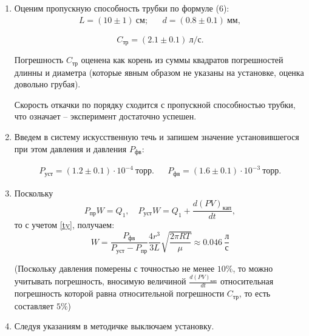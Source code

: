 \documentclass[a4paper,12pt]{article}
\begin{document}
\begin{enumerate}
  \item Оценим пропускную способность трубки по формуле (6):
        \begin{align}
          L = (10 \pm 1)~ см; &  & d = (0.8 \pm 0.1) ~ мм,
        \end{align}

        \begin{equation}
          C_{тр} = (2.1 \pm 0.1)~л / с.
        \end{equation}

        Погрешность $C_{тр}$  оценена как корень из суммы квадратов погрешностей длинны и диаметра (которые явным образом не указаны на установке, оценка довольно грубая).

        Скорость откачки по порядку сходится с пропускной способностью трубки, что означает -- эксперимент достаточно успешен.

  \item Введем в систему искусственную течь и запишем значение  установившегося при этом давления и давления $P_{фв}$:

        \begin{align}
          P_{уст} = (1.2 \pm 0.1) \cdot 10^{-4} ~ торр. &  & P_{фв} = (1.6 \pm 0.1) \cdot 10^{-3} ~ торр.
        \end{align}


  \item Поскольку
        $$P_{пр} W = Q_1, \quad P_{уст} W = Q_1 + \frac{d(PV)_{кап}}{dt},$$
        то с учетом \eqref{ty}, получаем:
        \begin{equation}
          W = \frac{P_{фв}}{P_{уст}-P_{пр}}\frac{4r^3}{3L}\sqrt{\frac{2\pi RT}{\mu}} \approx 0.046~\frac{л}{с}
        \end{equation}

        (Поскольку давления померены с точностью не менее $10\%$, то можно учитывать погрешность, вносимую величиной $\frac{d(PV)_{кап}}{dt}$ относительная погрешность которой равна относительной погрешности $C_{тр}$, то есть составляет $5\%$)


  \item Следуя указаниям в методичке выключаем установку.

\end{enumerate}
\end{document}
